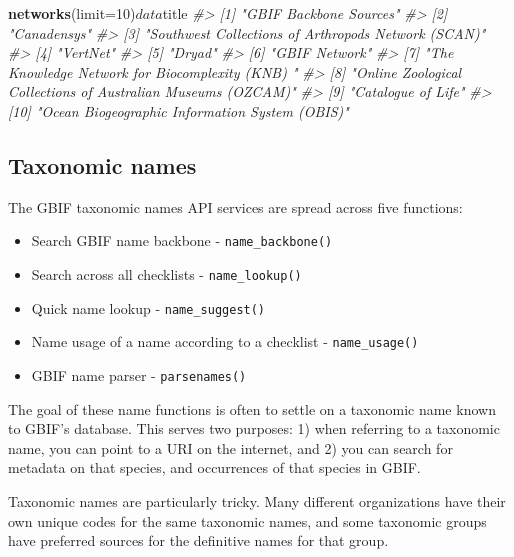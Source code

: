 \documentclass[author-year, review, 11pt]{components/elsarticle} %
\newenvironment{Shaded}{\begin{snugshade}}{\end{snugshade}}
\newcommand{\KeywordTok}[1]{\textcolor[rgb]{0.13,0.29,0.53}{\textbf{{#1}}}}
\newcommand{\DataTypeTok}[1]{\textcolor[rgb]{0.13,0.29,0.53}{{#1}}}
\newcommand{\DecValTok}[1]{\textcolor[rgb]{0.00,0.00,0.81}{{#1}}}
\newcommand{\CommentTok}[1]{\textcolor[rgb]{0.56,0.35,0.01}{\textit{{#1}}}}
\newcommand{\NormalTok}[1]{{#1}}
\begin{document}
\begin{Shaded}
\begin{Highlighting}[]
\KeywordTok{networks}\NormalTok{(}\DataTypeTok{limit=}\DecValTok{10}\NormalTok{)$data$title}
\CommentTok{#>  [1] "GBIF Backbone Sources"                                      }
\CommentTok{#>  [2] "Canadensys"                                                 }
\CommentTok{#>  [3] "Southwest Collections of Arthropods Network (SCAN)"         }
\CommentTok{#>  [4] "VertNet"                                                    }
\CommentTok{#>  [5] "Dryad"                                                      }
\CommentTok{#>  [6] "GBIF Network"                                               }
\CommentTok{#>  [7] "The Knowledge Network for Biocomplexity (KNB) "             }
\CommentTok{#>  [8] "Online Zoological Collections of Australian Museums (OZCAM)"}
\CommentTok{#>  [9] "Catalogue of Life"                                          }
\CommentTok{#> [10] "Ocean Biogeographic Information System (OBIS)"}
\end{Highlighting}
\end{Shaded}

\subsection{Taxonomic names}\label{taxonomic-names}

The GBIF taxonomic names API services are spread across five functions:

\begin{itemize}
\itemsep1pt\parskip0pt
\item
  Search GBIF name backbone - \texttt{name\_backbone()}
\item
  Search across all checklists - \texttt{name\_lookup()}
\item
  Quick name lookup - \texttt{name\_suggest()}
\item
  Name usage of a name according to a checklist - \texttt{name\_usage()}
\item
  GBIF name parser - \texttt{parsenames()}
\end{itemize}

The goal of these name functions is often to settle on a taxonomic name
known to GBIF's database. This serves two purposes: 1) when referring to
a taxonomic name, you can point to a URI on the internet, and 2) you can
search for metadata on that species, and occurrences of that species in
GBIF.

Taxonomic names are particularly tricky. Many different organizations
have their own unique codes for the same taxonomic names, and some
taxonomic groups have preferred sources for the definitive names for
that group.
\end{document}
